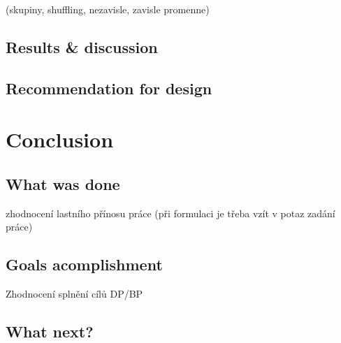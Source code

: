\documentclass[11pt,oneside,a4paper]{book}
\begin{document}
	(skupiny, shuffling, nezavisle, zavisle promenne)
	\section{Results \& discussion}
	\section{Recommendation for design}
	
	
	\chapter{Conclusion}
	\section{What was done}
	zhodnocení lastního přínosu práce (při formulaci je třeba vzít v potaz zadání práce)
	\section{Goals acomplishment}
	Zhodnocení splnění cílů DP/BP
	\section{What next?}
	
	
	
	
	{
		\def\CS{$\cal C\kern-0.1667em\lower.5ex\hbox{$\cal S$}\kern-0.075em $}
		
	}
	
	
\end{document}
